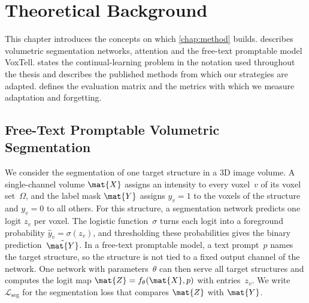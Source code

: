 %

\chapter{Theoretical Background}
\label{chap:background}

This chapter introduces the concepts on which \cref{chap:method} builds.
 describes volumetric segmentation networks, attention and the free-text promptable model VoxTell.
 states the continual-learning problem in the notation used throughout the thesis and describes the published methods from which our strategies are adapted.
 defines the evaluation matrix and the metrics with which we measure adaptation and forgetting.

\section{Free-Text Promptable Volumetric Segmentation}
\label{sec:bg-segmentation}

We consider the segmentation of one target structure in a 3D image volume.
A single-channel volume $\mat{X}$ assigns an intensity to every voxel~$v$ of its voxel set~$\Omega$, and the label mask $\mat{Y}$ assigns $y_v = 1$ to the voxels of the structure and $y_v = 0$ to all others.
For this structure, a segmentation network predicts one logit $z_v$ per voxel.
The logistic function~$\sigma$ turns each logit into a foreground probability $\hat{y}_v = \sigma(z_v)$, and thresholding these probabilities gives the binary prediction~$\hat{\mat{Y}}$.
In a free-text promptable model, a text prompt~$p$ names the target structure, so the structure is not tied to a fixed output channel of the network.
One network with parameters~$\theta$ can then serve all target structures and computes the logit map $\mat{Z} = f_\theta(\mat{X}, p)$ with entries~$z_v$.
We write $\mathcal{L}_{\mathrm{seg}}$ for the segmentation loss that compares $\mat{Z}$ with $\mat{Y}$.

